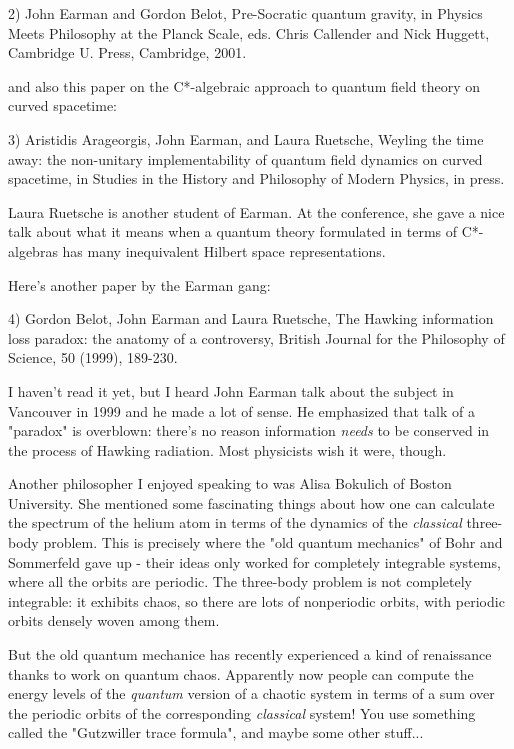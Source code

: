 2) John Earman and Gordon Belot, Pre-Socratic quantum gravity, 
in Physics Meets Philosophy at the Planck Scale, eds. Chris 
Callender and Nick Huggett, Cambridge U. Press, Cambridge, 2001.

and also this paper on the C*-algebraic approach to quantum
field theory on curved spacetime:

3) Aristidis Arageorgis, John Earman, and Laura Ruetsche,
Weyling the time away: the non-unitary implementability 
of quantum field dynamics on curved spacetime, in Studies
in the History and Philosophy of Modern Physics, in press.

Laura Ruetsche is another student of Earman.  At the conference,
she gave a nice talk about what it means when a quantum theory 
formulated in terms of C*-algebras has many inequivalent Hilbert 
space representations. 

Here's another paper by the Earman gang:

4) Gordon Belot, John Earman and Laura Ruetsche, The Hawking 
information loss paradox: the anatomy of a controversy, 
British Journal for the Philosophy of Science, 50 (1999), 189-230.

I haven't read it yet, but I heard John Earman talk about the subject 
in Vancouver in 1999 and he made a lot of sense.  He emphasized that
talk of a "paradox" is overblown: there's no reason information 
\emph{needs}
to be conserved in the process of Hawking radiation.  Most physicists
wish it were, though.

Another philosopher I enjoyed speaking to was Alisa Bokulich of Boston
University.  She mentioned some fascinating things about how one can 
calculate the spectrum of the helium atom in terms of the dynamics of 
the \emph{classical} three-body problem.  This is precisely where the "old 
quantum mechanics" of Bohr and Sommerfeld gave up - their ideas only 
worked for completely integrable systems, where all the orbits are
periodic.   The three-body problem is not completely integrable: it
exhibits chaos, so there are lots of nonperiodic orbits, with periodic 
orbits densely woven among them.

But the old quantum mechanice has recently experienced a kind of 
renaissance thanks to work on quantum chaos.  Apparently now
people can compute the energy levels of the \emph{quantum} version of 
a chaotic system in terms of a sum over the periodic orbits of the 
corresponding \emph{classical} system!  You use something called the 
"Gutzwiller trace formula", and maybe some other stuff...

